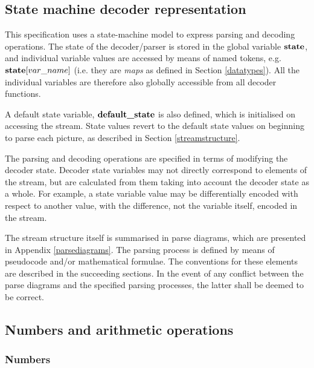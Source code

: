 \begin{comment}
This section is a bit of a jumble and needs reorganising
\end{comment}

\subsection{State machine decoder representation}

This specification uses a state-machine model to express parsing and
decoding operations. The state of the decoder/parser is stored in the
global variable $\textbf{state}$, and individual variable values are accessed
by means of named tokens, e.g. $\textbf{state}[var\_name]$ (i.e. they
are {\em maps} as defined in Section \ref{datatypes}). All the individual
variables are therefore also globally accessible from all decoder functions.

A default state variable, $\textbf{default\_state}$ is also defined, which is
initialised on accessing the stream. State values revert to the default
state values on beginning to parse each picture, as described in 
Section \ref{streamstructure}.

The parsing and decoding operations are specified in terms of modifying
the decoder state. Decoder state variables may not directly correspond
to elements of the stream, but are calculated from them taking into
account the decoder state as a whole. For example, a state variable value 
may be differentially encoded with respect to another value, with the
difference, not the variable itself, encoded in the stream. 

The stream structure itself is summarised in parse diagrams, which 
are presented in Appendix \ref{parsediagrams}. The parsing process
is defined by means of pseudocode and/or mathematical formulae. The
conventions for these elements are described in the succeeding sections.
In the event of any conflict between the parse diagrams and the specified
parsing processes, the latter shall be deemed to be correct.

\subsection{Numbers and arithmetic operations}
\label{mathnotation}

\subsubsection{Numbers}
\label{numbers}

